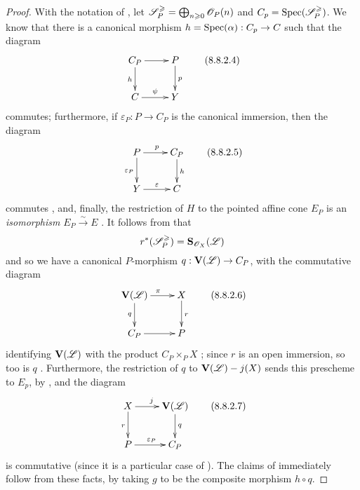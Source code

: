 \begin{proof}
With the notation of , let $\mathscr{S}_P^\geqslant = \bigoplus_{n\geqslant0}\mathscr{O}_P(n)$ and $C_p=\operatorname{Spec}(\mathscr{S}_P^\geqslant)$.
We know  that there is a canonical morphism $h=\Spec(\alpha):C_p\to C$ such that the diagram
\[
\label{II.8.8.2.4}
  \xymatrix{
    C_P
      \ar[r]
      \ar[d]_{h}
  & P
      \ar[d]^{p}
  \\C
      \ar[r]^{\psi}
  & Y
  }
\tag{8.8.2.4}
\]
commutes; furthermore, if $\varepsilon_P:P\to C_P$ is the canonical immersion, then the diagram
\[
\label{II.8.8.2.5}
  \xymatrix{
    P
      \ar[r]^{p}
      \ar[d]_{\varepsilon_P}
  & C_P
      \ar[d]^{h}
  \\Y
      \ar[r]^{\varepsilon}
  & C
  }
\tag{8.8.2.5}
\]
commutes , and, finally, the restriction of $H$ to the pointed affine cone $E_P$ is an \emph{isomorphism} $E_P\xrightarrow{\sim}E$ .
It follows from  that
\[
  r^*(\mathscr{S}_P^\geqslant)=\mathbf{S}_{\mathscr{O}_X}(\mathscr{L})
\]
and so we have a canonical $P$-morphism $q:\bb{V}(\sh{L})\to C_P$, with the commutative diagram
\[
\label{II.8.8.2.6}
  \xymatrix{
    \bb{V}(\sh{L})
      \ar[r]^{\pi}
      \ar[d]_{q}
  & X
      \ar[d]^{r}
  \\C_P
      \ar[r]
  & P
  }
\tag{8.8.2.6}
\]
identifying $\mathbf{V}(\mathscr{L})$ with the product $C_P\times_P X$ ;
since $r$ is an open immersion, so too is $q$ .
Furthermore, the restriction of $q$ to $\mathbf{V}(\mathscr{L})- j(X)$ sends this prescheme to $E_p$, by , and the diagram
\[
\label{II.8.8.2.7}
  \xymatrix{
    X
      \ar[r]^{j}
      \ar[d]_{r}
  & \bb{V}(\sh{L})
      \ar[d]^{q}
  \\P
      \ar[r]^{\varepsilon_P}
  & C_P
  }
\tag{8.8.2.7}
\]
is commutative (since it is a particular case of ).
The claims of  immediately follow from these facts, by taking $g$ to be the composite morphism $h\circ q$.
\end{proof}

